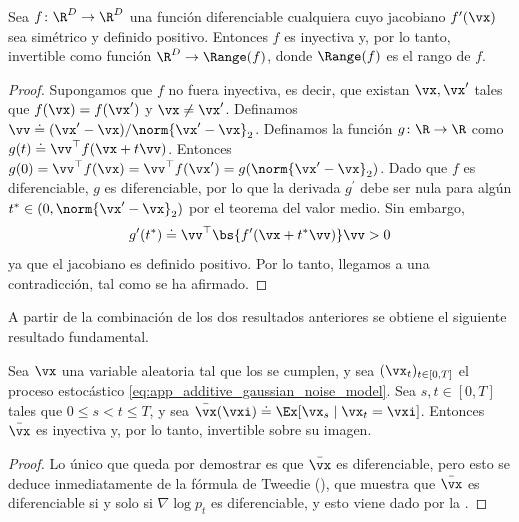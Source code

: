 \documentclass[../../book-main_es.tex]{subfiles}
\begin{document}
\begin{lemma}\label{lem:gribonval_A2}
    Sea \(f \colon \R^{D} \to \R^{D}\) una función diferenciable cualquiera
    cuyo jacobiano \(f^{\prime}(\vx)\) sea simétrico y definido positivo.
    Entonces \(f\) es inyectiva y, por lo tanto, invertible como
    función \(\R^{D} \to \Range(f)\), donde \(\Range(f)\) es el rango de \(f\).
\end{lemma}
\begin{proof}
    Supongamos que \(f\) no fuera inyectiva, es decir, que existan \(\vx,
    \vx^{\prime}\) tales que \(f(\vx) = f(\vx^{\prime})\) y \(\vx
    \neq \vx^{\prime}\). Definamos \(\vv \doteq (\vx^{\prime} -
    \vx)/\norm{\vx^{\prime} - \vx}_{2}\). Definamos la función \(g
    \colon \R \to \R\) como \(g(t) \doteq \vv^{\top}f(\vx + t\vv)\).
    Entonces \(g(0) = \vv^{\top}f(\vx) = \vv^{\top}f(\vx^{\prime}) =
    g(\norm{\vx^{\prime} - \vx}_{2})\). Dado que \(f\) es
    diferenciable, \(g\) es diferenciable, por lo que la derivada
    \(g^{\prime}\) debe ser nula para algún \(t^{\ast} \in (0,
    \norm{\vx^{\prime} - \vx}_{2})\) por el teorema del valor medio. Sin embargo,
    \begin{equation}
        g^{\prime}(t^{\ast}) \doteq \vv^{\top}\bs{f^{\prime}(\vx +
        t^{\ast}\vv)}\vv > 0
    \end{equation}
    ya que el jacobiano es definido positivo. Por lo tanto, llegamos a una
    contradicción, tal como se ha afirmado.
\end{proof}

A partir de la combinación de los dos resultados anteriores se obtiene el siguiente resultado fundamental.

\begin{corollary}\label{cor:gribonval_A2}
    Sea \(\vx\) una variable aleatoria tal que los
    se cumplen, y sea \((\vx_{t})_{t \in [0, T]}\) el proceso estocástico
    \eqref{eq:app_additive_gaussian_noise_model}. Sea \(s, t
    \in [0, T]\) tales que \(0 \leq s < t \leq T\), y sea
    \(\bar{\vx}(\vxi) \doteq \Ex[\vx_{s} \mid \vx_{t} = \vxi]\). Entonces
    \(\bar{\vx}\) es inyectiva y, por lo tanto, invertible sobre su imagen.
\end{corollary}
\begin{proof}
    Lo único que queda por demostrar es que \(\bar{\vx}\) es
    diferenciable, pero esto se deduce inmediatamente de la fórmula de Tweedie
    (), que muestra que \(\bar{\vx}\) es
    diferenciable si y solo si \(\nabla \log p_{t}\) es
    diferenciable, y esto viene dado por la .
\end{proof}
\end{document}
